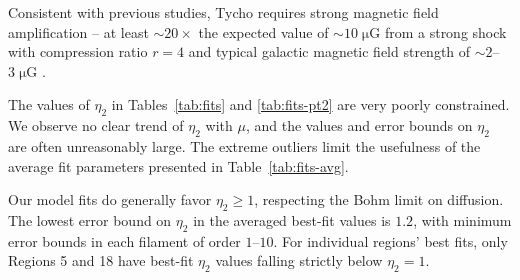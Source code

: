 \documentclass[iop, apj, numberedappendix]{emulateapj}
\newcommand*{\mt}{\mathrm}
\newcommand*{\unit}[1]{\;\mt{#1}}  %
\newcommand*{\abt}{\mathord{\sim}} %
\newcommand*{\Ecut}{E_{\mt{cut}}}
\newcommand*{\muG}{\unit{\mu G}}
\begin{document}
Consistent with previous studies, Tycho requires strong magnetic field
amplification -- at least $\abt 20\times$ the expected value of $\abt 10 \muG$
from a strong shock with compression ratio $r=4$ and typical galactic magnetic
field strength of $\abt 2$--$3 \muG$ \citep{lyne1989, han2006}.




The values of $\eta_2$ in Tables~\ref{tab:fits} and \ref{tab:fits-pt2} are very
poorly constrained.  We observe no clear trend of $\eta_2$ with $\mu$, and the
values and error bounds on $\eta_2$ are often unreasonably large.  The extreme
outliers limit the usefulness of the average fit parameters presented in
Table~\ref{tab:fits-avg}.

Our model fits do generally favor $\eta_2 \geq 1$, respecting the Bohm limit on
diffusion.  The lowest error bound on $\eta_2$ in the averaged best-fit values
is $1.2$, with minimum error bounds in each filament of order $1$--$10$.  For
individual regions' best fits, only Regions 5 and 18 have best-fit $\eta_2$
values falling strictly below $\eta_2 = 1$.  
\end{document}
